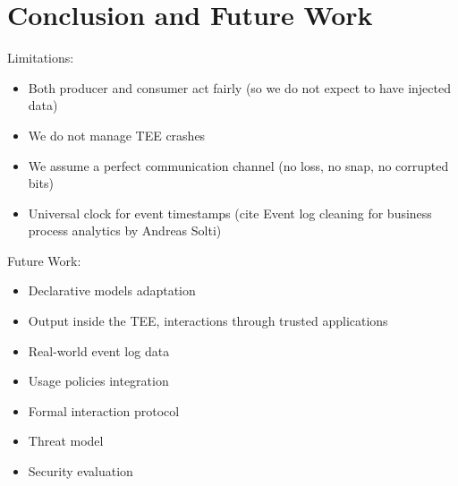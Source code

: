 \section{Conclusion and Future Work}
Limitations:
\begin{itemize}
    \item Both producer and consumer act fairly (so we do not expect to have injected data)
    \item We do not manage TEE crashes
    \item We assume a perfect communication channel (no loss, no snap, no corrupted bits)
    \item Universal clock for event timestamps (cite Event log cleaning for business process analytics by Andreas Solti)
\end{itemize} 
Future Work:
\begin{itemize}
    \item Declarative models adaptation
    \item Output inside the TEE, interactions through trusted applications
    \item Real-world event log data
    \item Usage policies integration
    \item Formal interaction protocol
    \item Threat model
    \item Security evaluation
\end{itemize}


